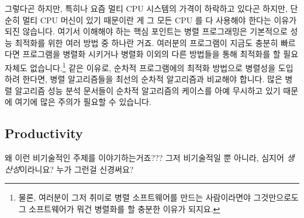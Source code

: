 그렇다곤 하지만, 특히나 요즘 멀티 CPU 시스템의 가격이 하락하고 있다곤 하지만,
단순히 멀티 CPU 머신이 있기 때문이란 게 그 모든 CPU 를 다 사용해야 한다는
이유가 되진 않습니다.
여기서 이해해야 하는 핵심 포인트는 병렬 프로그래밍은 기본적으로 성능 최적화를
위한 여러 방법 중 하나란 거죠.
여러분의 프로그램이 지금도 충분히 빠르다면 프로그램을 병렬화 시키거나 병렬화
이외의 다른 방법들을 통해 최적화를 할 필요 자체도 없습니다.\footnote{
	물론, 여러분이 그저 취미로 병렬 소프트웨어를 만드는 사람이라면야
	그것만으로도 그 소프트웨어가 뭐건 병렬화를 할 충분한 이유가 되지요.}
같은 이유로, 순차적 프로그램에의 최적화 방법으로 병렬성을 도입하려 한다면, 병렬
알고리즘들을 최선의 순차적 알고리즘과 비교해야 합니다.
많은 병렬 알고리즘 성능 분석 문서들이 순차적 알고리즘의 케이스를 아예 무시하고
있기 때문에 여기에 많은 주의가 필요할 수 있습니다.

\subsection{Productivity}
\label{sec:intro:Productivity}

\QuickQuiz{}
	왜 이런 비기술적인 주제를 이야기하는거죠???
	그저 비기술적일 뿐 아니라, 심지어 \emph{생산성}이라니요?
	누가 그런걸 신경써요?
\iffalse

